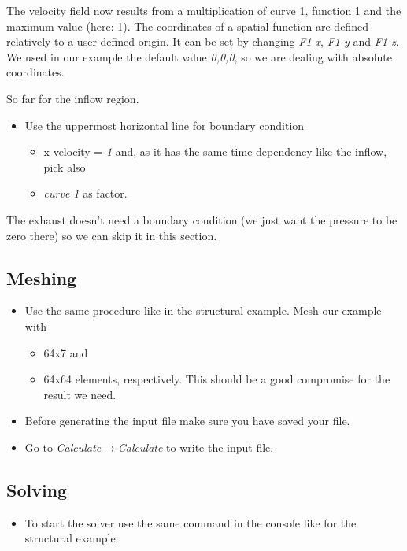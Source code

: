 The velocity field now results from a multiplication of curve 1, function
1 and the maximum value (here: 1). The coordinates of a spatial function are defined relatively to a user-defined origin. It can be set by changing \emph{F1 x}, \emph{F1 y} and  \emph{F1 z}. We used in our example the default value \emph{0,0,0}, so we are dealing with absolute coordinates.

So far for the inflow region.

\begin{itemize}
\item Use the uppermost horizontal line for boundary condition

\begin{itemize}
\item x-velocity = \emph{1} and, as it has the same time dependency like
the inflow, pick also
\item \emph{curve 1} as factor.
\end{itemize}
\end{itemize}
The exhaust doesn't need a boundary condition (we just want the pressure
to be zero there) so we can skip it in this section.


\subsection{Meshing}

\begin{itemize}
\item Use the same procedure like in the structural example. Mesh our example
with

\begin{itemize}
\item 64x7 and
\item 64x64 elements, respectively. This should be a good compromise for
the result we need.
\end{itemize}
\item Before generating the input file make sure you have saved your file.
\item Go to \emph{Calculate$\to$Calculate} to write the input file.
\end{itemize}

\subsection{Solving}

\begin{itemize}
\item To start the solver use the same command in the console like for the
structural example.
\end{itemize}

